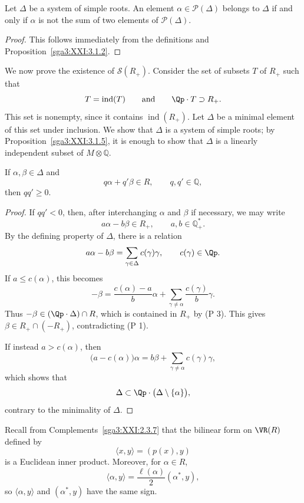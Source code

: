 \begin{lemma}\label{sga3:XXI:3.2.9}
Let \(\Delta\) be a system of simple roots. An element
\(\alpha\in\mathscr{P}(\Delta)\) belongs to \(\Delta\) if and only if
\(\alpha\) is not the sum of two elements of
\(\mathscr{P}(\Delta)\).
\end{lemma}

\begin{proof}
This follows immediately from the definitions and
Proposition~\ref{sga3:XXI:3.1.2}.
\end{proof}

We now prove the existence of \(\mathscr{S}(R_+)\). Consider the set
of subsets \(T\) of \(R_+\) such that
\[
 T=\operatorname{ind}(T)
 \qquad\text{and}\qquad
 \Qp\cdot T\supset R_+.
\]
This set is nonempty, since it contains
\(\operatorname{ind}(R_+)\). Let \(\Delta\) be a minimal element of
this set under inclusion. We show that \(\Delta\) is a system of
simple roots; by Proposition~\ref{sga3:XXI:3.1.5}, it is enough to
show that \(\Delta\) is a linearly independent subset of
\(M\otimes\mathbb Q\).

\begin{lemma}\label{sga3:XXI:3.2.10}
If \(\alpha,\beta\in\Delta\) and
\[
 q\alpha+q'\beta\in R,
 \qquad q,q'\in\mathbb Q,
\]
then \(qq'\geq0\).
\end{lemma}

\begin{proof}
If \(qq'<0\), then, after interchanging \(\alpha\) and \(\beta\) if
necessary, we may write
\[
 a\alpha-b\beta\in R_+,
 \qquad a,b\in\mathbb Q^\ast_+.
\]
By the defining property of \(\Delta\), there is a relation
\[
 a\alpha-b\beta
   =\sum_{\gamma\in\Delta}c(\gamma)\gamma,
 \qquad c(\gamma)\in\Qp.
\]
If \(a\leq c(\alpha)\), this becomes
\[
 -\beta
 =\frac{c(\alpha)-a}{b}\alpha
  +\sum_{\gamma\neq\alpha}\frac{c(\gamma)}{b}\gamma.
\]
Thus \(-\beta\in(\Qp\cdot\Delta)\cap R\), which is contained in
\(R_+\) by (P 3). This gives
\(\beta\in R_+\cap(-R_+)\), contradicting (P 1).

If instead \(a>c(\alpha)\), then
\[
 \bigl(a-c(\alpha)\bigr)\alpha
 =b\beta+\sum_{\gamma\neq\alpha}c(\gamma)\gamma,
\]
which shows that
\[
 \Delta\subset\Qp\cdot\bigl(\Delta\setminus\{\alpha\}\bigr),
\]
contrary to the minimality of \(\Delta\).
\end{proof}


Recall from Complements~\ref{sga3:XXI:2.3.7} that the bilinear form on
\(\VR(R)\) defined by
\[
 \langle x,y\rangle=(p(x),y)
\]
is a Euclidean inner product. Moreover, for \(\alpha\in R\),
\[
 \langle\alpha,y\rangle
 =\frac{\ell(\alpha)}{2}(\alpha^\ast,y),
\]
so \(\langle\alpha,y\rangle\) and \((\alpha^\ast,y)\) have the same
sign.

